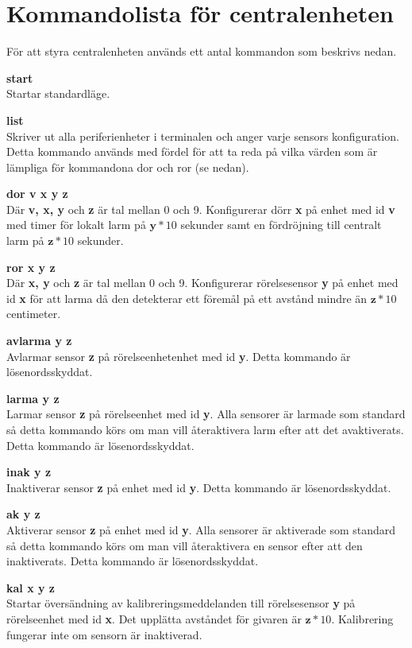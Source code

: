 \documentclass{article}
\begin{document}
    \section{Kommandolista för centralenheten}
    \label{kommandon}
        För att styra centralenheten används ett antal kommandon som beskrivs nedan.

    \textbf{start}\\
    Startar standardläge.

    \textbf{list}\\
    Skriver ut alla periferienheter i terminalen och anger varje sensors konfiguration. Detta kommando används med fördel för att ta reda på vilka värden som är lämpliga för kommandona dor och ror (se nedan).

    \textbf{dor v x y z}\\
    Där \textbf{v, x, y} och \textbf{z} är tal mellan 0 och 9. Konfigurerar dörr \textbf{x} på enhet med id \textbf{v} med timer för lokalt larm på  \(\textbf{y} * 10\) sekunder samt en fördröjning till centralt larm på \(\textbf{z} * 10\) sekunder.

    \textbf{ror x y z}\\
    Där \textbf{x, y} och \textbf{z} är tal mellan 0 och 9. Konfigurerar rörelsesensor \textbf{y} på enhet med id \textbf{x} för att larma då den detekterar ett föremål på ett avstånd mindre än \(\textbf{z} * 10\) centimeter.

    \textbf{avlarma y z} \\
    Avlarmar sensor \textbf{z} på rörelseenhetenhet med id \textbf{y}. Detta kommando är lösenordsskyddat.

    \textbf{larma y z} \\
    Larmar sensor \textbf{z} på rörelseenhet med id \textbf{y}. Alla sensorer är larmade som standard så detta kommando körs om man vill återaktivera larm efter att det avaktiverats. Detta kommando är lösenordsskyddat.

    \textbf{inak y z} \\
    Inaktiverar sensor \textbf{z} på enhet med id \textbf{y}. Detta kommando är lösenordsskyddat.

    \textbf{ak y z} \\
    Aktiverar sensor \textbf{z} på enhet med id \textbf{y}. Alla sensorer är aktiverade som standard så detta kommando körs om man vill återaktivera en sensor efter att den inaktiverats. Detta kommando är lösenordsskyddat.

    \textbf{kal x y z} \\
    Startar översändning av kalibreringsmeddelanden till rörelsesensor \textbf{y} på rörelseenhet med id \textbf{x}. Det upplätta avståndet för givaren är \(\textbf{z} * 10\). Kalibrering fungerar inte om sensorn är inaktiverad.
\end{document}
